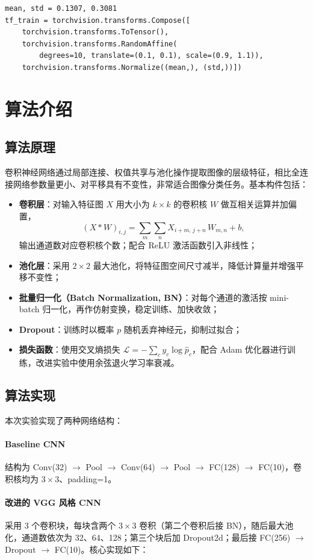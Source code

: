 \documentclass[UTF8,zihao=-4]{ctexart}
\begin{document}
\begin{lstlisting}
mean, std = 0.1307, 0.3081
tf_train = torchvision.transforms.Compose([
    torchvision.transforms.ToTensor(),
    torchvision.transforms.RandomAffine(
        degrees=10, translate=(0.1, 0.1), scale=(0.9, 1.1)),
    torchvision.transforms.Normalize((mean,), (std,))])
\end{lstlisting}

\section{算法介绍}
\subsection{算法原理}
卷积神经网络通过局部连接、权值共享与池化操作提取图像的层级特征，相比全连接网络参数量更小、对平移具有不变性，非常适合图像分类任务。基本构件包括：
\begin{itemize}
  \item \textbf{卷积层}：对输入特征图 $X$ 用大小为 $k\times k$ 的卷积核 $W$ 做互相关运算并加偏置，
  \[
    (X * W)_{i,j} = \sum_{m}\sum_{n} X_{i+m,\,j+n}\, W_{m,n} + b,
  \]
  输出通道数对应卷积核个数；配合 ReLU 激活函数引入非线性；
  \item \textbf{池化层}：采用 $2\times 2$ 最大池化，将特征图空间尺寸减半，降低计算量并增强平移不变性；
  \item \textbf{批量归一化（Batch Normalization, BN）}：对每个通道的激活按 mini-batch 归一化，再作仿射变换，稳定训练、加快收敛；
  \item \textbf{Dropout}：训练时以概率 $p$ 随机丢弃神经元，抑制过拟合；
  \item \textbf{损失函数}：使用交叉熵损失 $\mathcal{L} = -\sum_c y_c \log \hat{p}_c$，配合 Adam 优化器进行训练，改进实验中使用余弦退火学习率衰减。
\end{itemize}

\subsection{算法实现}
本次实验实现了两种网络结构：

\paragraph{Baseline CNN} 结构为 Conv(32) $\to$ Pool $\to$ Conv(64) $\to$ Pool $\to$ FC(128) $\to$ FC(10)，卷积核均为 $3\times 3$、padding=1。

\paragraph{改进的 VGG 风格 CNN} 采用 3 个卷积块，每块含两个 $3\times 3$ 卷积（第二个卷积后接 BN），随后最大池化，通道数依次为 32、64、128；第三个块后加 Dropout2d；最后接 FC(256) $\to$ Dropout $\to$ FC(10)。核心实现如下：
\end{document}
